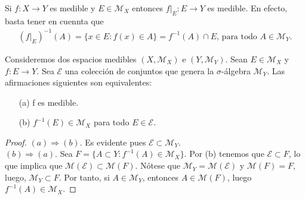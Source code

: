 \begin{obs}
 Si $f: X \longrightarrow Y$ es medible y $E \in \mathcal{M}_X$ entonces $f|_E: E \longrightarrow Y$ es medible. En efecto, basta tener en cuennta que
 \begin{align*}
     (f|_E)^{-1}(A) = \{ x \in E : f(x) \in A \} = f^{-1}(A) \cap E \text{, para todo } A \in \mathcal{M}_Y.
 \end{align*}
 \end{obs}
 \begin{teo}
Consideremos dos espacios medibles $(X, \mathcal{M}_X)$ e $(Y, \mathcal{M}_Y)$. Sean $E \in \mathcal{M}_X$ y $f : E \longrightarrow Y$. Sea $\mathcal{E}$ una colección de conjuntos que genera la $\sigma$-álgebra $\mathcal{M}_Y$. Las afirmaciones siguientes son equivalentes:
 \begin{enumerate}
     \item[(a)] f es medible.
     \item[(b)] $f^{-1}(E) \in \mathcal{M}_X$ para todo $E \in \mathcal{E}$. 
 \end{enumerate}
 \end{teo}
 \begin{proof}
 $(a) \Longrightarrow (b)$. Es evidente pues $\mathcal{E} \subset \mathcal{M}_Y$.
 \\
 \newline
 $(b) \Longrightarrow (a)$. Sea $F = \{ A \subset  Y : f^{-1}(A) \in \mathcal{M}_X\}$. Por (b) tenemos que $\mathcal{E} \subset F$, lo que implica que $\mathcal{M}(\mathcal{E}) \subset \mathcal{M}(F)$. Nótese que $\mathcal{M}_Y = \mathcal{M}(\mathcal{E})$ y $\mathcal{M}(F) = F$, luego, $\mathcal{M}_Y \subset F$. Por tanto, si $A \in \mathcal{M}_Y$, entonces $A \in \mathcal{M}(F)$, luego $f^{-1}(A) \in \mathcal{M}_X$.
 \end{proof}
 
